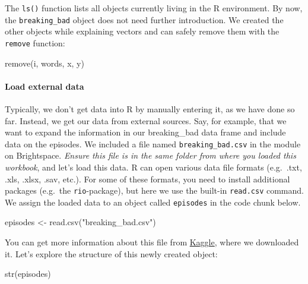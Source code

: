 \documentclass[
]{article}
\newenvironment{Shaded}{\begin{snugshade}}{\end{snugshade}}
\newcommand{\FunctionTok}[1]{\textcolor[rgb]{0.00,0.00,0.00}{#1}}
\newcommand{\NormalTok}[1]{#1}
\newcommand{\OtherTok}[1]{\textcolor[rgb]{0.56,0.35,0.01}{#1}}
\newcommand{\StringTok}[1]{\textcolor[rgb]{0.31,0.60,0.02}{#1}}
\begin{document}
The \texttt{ls()} function lists all objects currently living in the R
environment. By now, the \texttt{breaking\_bad} object does not need
further introduction. We created the other objects while explaining
vectors and can safely remove them with the \texttt{remove} function:

\begin{Shaded}
\begin{Highlighting}[]
\FunctionTok{remove}\NormalTok{(i, words, x, y)}
\end{Highlighting}
\end{Shaded}

\hypertarget{load-external-data}{%
\paragraph{Load external data}\label{load-external-data}}

Typically, we don't get data into R by manually entering it, as we have
done so far. Instead, we get our data from external sources. Say, for
example, that we want to expand the information in our breaking\_bad
data frame and include data on the episodes. We included a file named
\texttt{breaking\_bad.csv} in the module on Brightspace. \emph{Ensure
this file is in the same folder from where you loaded this workbook},
and let's load this data. R can open various data file formats
(e.g.~.txt, .xls, .xlsx, .sav, etc.). For some of these formats, you
need to install additional packages (e.g.~the \texttt{rio}-package), but
here we use the built-in \texttt{read.csv} command. We assign the loaded
data to an object called \texttt{episodes} in the code chunk below.

\begin{Shaded}
\begin{Highlighting}[]
\NormalTok{episodes }\OtherTok{\textless{}{-}} \FunctionTok{read.csv}\NormalTok{(}\StringTok{"breaking\_bad.csv"}\NormalTok{)}
\end{Highlighting}
\end{Shaded}

You can get more information about this file from
\href{https://www.kaggle.com/datasets/varpit94/breaking-bad-tv-show-all-seasons-episodes-data?resource=download}{Kaggle},
where we downloaded it. Let's explore the structure of this newly
created object:

\begin{Shaded}
\begin{Highlighting}[]
\FunctionTok{str}\NormalTok{(episodes)}
\end{Highlighting}
\end{Shaded}
\end{document}
